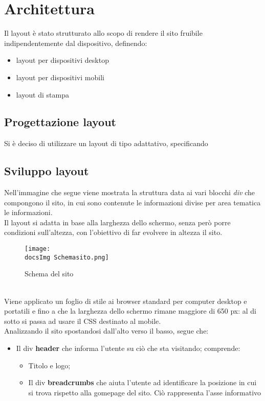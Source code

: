 \section{Architettura}{
	Il layout è stato strutturato allo scopo di rendere il sito fruibile indipendentemente dal dispositivo, definendo:
	\begin{itemize}\itemsep1pt
		\item layout per dispositivi desktop
		\item layout per dispositivi mobili
		\item layout di stampa
	\end{itemize} 
	
	\subsection{Progettazione layout}{
		Si è deciso di utilizzare un layout di tipo adattativo, specificando 
	}
	\subsection{Sviluppo layout}{
		Nell'immagine che segue viene mostrata la struttura data ai vari blocchi \textit{div} che compongono il sito, in cui sono contenute le informazioni divise per area tematica le informazioni.
	\\
	Il layout si adatta in base alla larghezza dello schermo, senza però porre condizioni sull'altezza, con l'obiettivo di far evolvere in altezza il sito.
		\begin{figure}[H]
			\texttt{[image: \\docsImg Schemasito.png]}
			\caption{Schema del sito}
			\label{Schema del sito}
		\end{figure}
		\\
		Viene applicato un foglio di stile ai browser standard per computer desktop e portatili e fino a che la larghezza dello schermo rimane maggiore di 650 px: al di sotto si passa ad usare il CSS destinato al mobile.
		\\
		Analizzando il sito spostandosi dall'alto verso il basso, segue che:
		\begin{itemize}
			\item Il div \textbf{header} che informa l'utente su ciò che sta visitando; comprende:
			\begin{itemize}
				\item Titolo e logo;
				\item Il div \textbf{breadcrumbs} che aiuta l'utente ad identificare la posizione in cui si trova rispetto alla gomepage del sito. Ciò rappresenta l'asse informativo 
			\end{itemize}
		\end{itemize}
		}
}
